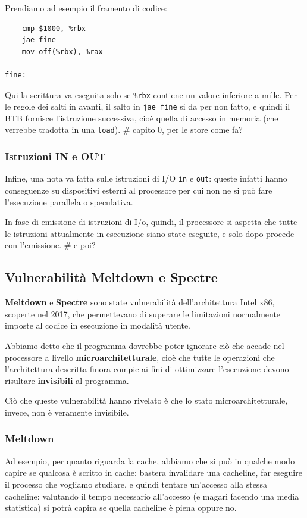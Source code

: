 \documentclass[a4paper,11pt]{article}
\begin{document}
Prendiamo ad esempio il framento di codice:
\begin{lstlisting}	
	cmp $1000, %rbx
	jae fine
	mov off(%rbx), %rax

fine:
\end{lstlisting}

Qui la scrittura va eseguita solo se \lstinline|%rbx| contiene un valore inferiore a mille.
Per le regole dei salti in avanti, il salto in \lstinline|jae fine| si da per non fatto, e quindi il BTB fornisce l'istruzione successiva, cioè quella di accesso in memoria (che verrebbe tradotta in una \lstinline|load|). # capito 0, per le store come fa?

\subsubsection{Istruzioni IN e OUT}
Infine, una nota va fatta sulle istruzioni di I/O \lstinline|in| e \lstinline|out|: queste infatti hanno conseguenze su dispositivi esterni al processore per cui non ne si può fare l'esecuzione parallela o speculativa.

In fase di emissione di istruzioni di I/o, quindi, il processore si aspetta che tutte le istruzioni attualmente in esecuzione siano state eseguite, e solo dopo procede con l'emissione. # e poi?

\subsection{Vulnerabilità Meltdown e Spectre}
\textbf{Meltdown} e \textbf{Spectre} sono state vulnerabilità dell'architettura Intel x86, scoperte nel 2017, che permettevano di superare le limitazioni normalmente imposte al codice in esecuzione in modalità utente.

Abbiamo detto che il programma dovrebbe poter ignorare ciò che accade nel processore a livello \textbf{microarchitetturale}, cioè che tutte le operazioni che l'architettura descritta finora compie ai fini di ottimizzare l'esecuzione devono risultare \textbf{invisibili} al programma.

Ciò che queste vulnerabilità hanno rivelato è che lo stato microarchitetturale, invece, non è veramente invisibile.

\subsubsection{Meltdown}
Ad esempio, per quanto riguarda la cache, abbiamo che si può in qualche modo capire se qualcosa è scritto in cache: bastera invalidare una cacheline, far eseguire il processo che vogliamo studiare, e quindi tentare un'accesso alla stessa cacheline: valutando il tempo necessario all'accesso (e magari facendo una media statistica) si potrà capira se quella cacheline è piena oppure no.
\end{document}
